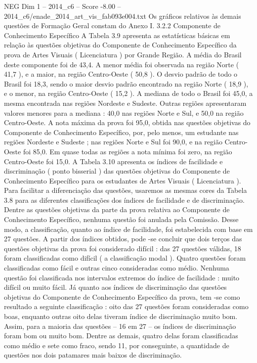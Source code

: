 \begin{textsample}{NEG Dim 1 – 2014\_c6 – Score -8.00 – 2014\_c6/enade\_2014\_art\_vis\_fab093e004.txt}
Os gráficos relativos às demais questões de Formação Geral constam do Anexo I. 3.2.2 Componente de Conhecimento Específico A Tabela 3.9 apresenta as estatísticas básicas em relação às questões objetivas do Componente de Conhecimento Específico da prova de Artes Visuais ( Licenciatura ) por Grande Região.
A média do Brasil deste componente foi de 43,4.
A menor média foi observada na região Norte ( 41,7 ), e a maior, na região Centro-Oeste ( 50,8 ).
O desvio padrão de todo o Brasil foi 18,3, sendo o maior desvio padrão encontrado na região Norte ( 18,9 ), e o menor, na região Centro-Oeste ( 15,2 ).
A mediana de todo o Brasil foi 45,0, a mesma encontrada nas regiões Nordeste e Sudeste.
Outras regiões apresentaram valores menores para a mediana : 40,0 nas regiões Norte e Sul, e 50,0 na região Centro-Oeste.
A nota máxima da prova foi 95,0, obtida nas questões objetivas do Componente de Conhecimento Específico, por, pelo menos, um estudante nas regiões Nordeste e Sudeste ; nas regiões Norte e Sul foi 90,0, e na região Centro-Oeste foi 85,0.
Em quase todas as regiões a nota mínima foi zero, na região Centro-Oeste foi 15,0.
A Tabela 3.10 apresenta os índices de facilidade e discriminação ( ponto bisserial ) das questões objetivas do Componente de Conhecimento Específico para os estudantes de Artes Visuais ( Licenciatura ).
Para facilitar a diferenciação das questões, usaremos as mesmas cores da Tabela 3.8 para as diferentes classificações dos índices de facilidade e de discriminação.
Dentre as questões objetivas da parte da prova relativa ao Componente de Conhecimento Específico, nenhuma questão foi anulada pela Comissão.
Desse modo, a classificação, quanto ao índice de facilidade, foi estabelecida com base em 27 questões.
A partir dos índices obtidos, pode -se concluir que dois terços das questões objetivas da prova foi considerado difícil : das 27 questões válidas, 18 foram classificadas como difícil ( a classificação modal ).
Quatro questões foram classificadas como fácil e outras cinco consideradas como médio.
Nenhuma questão foi classificada nos intervalos extremos do índice de facilidade : muito difícil ou muito fácil.
Já quanto aos índices de discriminação das questões objetivas do Componente de Conhecimento Específico da prova, tem -se como resultado a seguinte classificação : oito das 27 questões foram consideradas como boas, enquanto outras oito delas tiveram índice de discriminação muito bom.
Assim, para a maioria das questões – 16 em 27 – os índices de discriminação foram bom ou muito bom.
Dentre as demais, quatro delas foram classificadas como médio e sete como fraco, sendo 11, por conseguinte, a quantidade de questões nos dois patamares mais baixos de discriminação.

\end{textsample}
